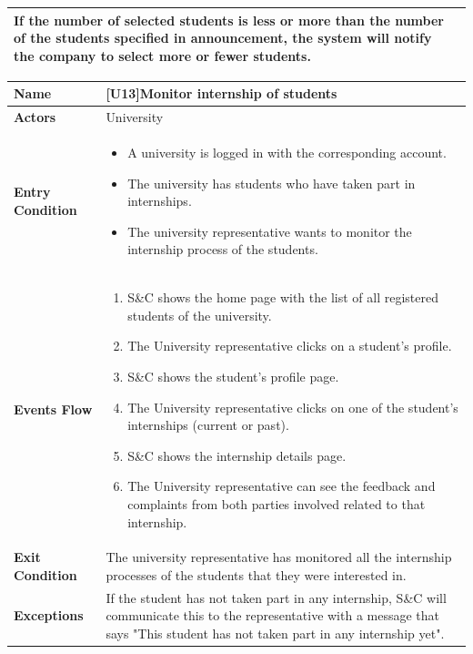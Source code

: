 \begin{center}
\begin{tabular}{|p{9em}|p{27em}|}
         If the number of selected students is less or more than the number of the students specified in announcement, the system will notify the company to 
         select more or fewer students.\\
        \hline
    \end{tabular}
\end{center}

\begin{center}
    \begin{tabular}{|p{9em}|p{27em}|}
        \hline
        \rowcolor{bluepoli!40} %
        \textbf{Name} & \textbf{[U13]Monitor internship of students} \\
        \hline
        \textbf{Actors} & University \\
        \hline
        \textbf{Entry Condition} & 
        \begin{itemize}
            \item A university is logged in with the corresponding account.
            \item The university has students who have taken part in internships.
            \item The university representative wants to monitor the internship process of the students.
        \end{itemize} \\
        \hline
        \textbf{Events Flow} & 
        \begin{enumerate}
            \item S\&C shows the home page with the list of all registered students of the university.
            \item The University representative clicks on a student's profile.
            \item S\&C shows the student's profile page.
            \item The University representative clicks on one of the student's internships (current or past).
            \item S\&C shows the internship details page.
            \item The University representative can see the feedback and complaints from both parties involved related to that internship.
        \end{enumerate} \\
        \hline
        \textbf{Exit Condition} & The university representative has monitored all the internship processes of the students that they were
        interested in. \\
        \hline
        \textbf{Exceptions} & If the student has not taken part in any internship, S\&C will communicate this to the representative with a 
        message that says "This student has not taken part in any internship yet". \\
        \hline
    \end{tabular}
\end{center}



